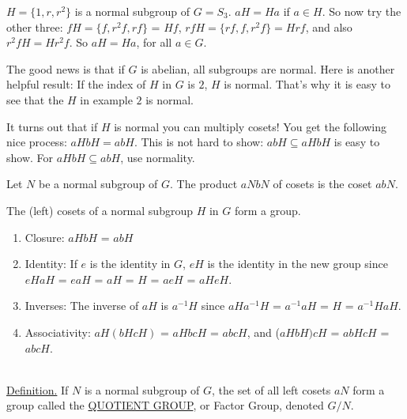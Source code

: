 \documentclass[12pt]{book}
\theoremstyle{definition}
\begin{document}
\begin{tcexample}{}{}
	$H = \{1, r, r^2\}$   is a normal subgroup of $G=S_3$. $aH = Ha$ if $a\in H$. So now try the other three: $fH = \{f, r^2f, rf\}$ = $Hf$, $rfH = \{rf, f, r^2f\} = Hrf$, and also $r^2fH = Hr^2f$. So $aH = Ha$, for all $a\in G$.
\end{tcexample}

The good news is that if $G$ is abelian, all subgroups are normal. Here is another helpful result: If the index of $H$ in $G$ is $2$, $H$ is normal. That's why it is easy to see that the $H$ in example $2$ is normal.

It turns out that if $H$ is normal you can multiply cosets! You get the following nice process: $aHbH = abH$. This is not hard to show: $abH\subseteq aHbH$ is easy to show. For $aHbH\subseteq abH$, use normality.

\begin{tctheorem}{}{}
Let $N$ be a normal subgroup of $G$. The product  $aNbN$ of cosets is the coset $abN$.
\end{tctheorem}

\begin{tctheorem}{}{}
 The (left) cosets of a normal subgroup $H$ in $G$ form a group.
\end{tctheorem}

\begin{newproof}
	\begin{enumerate}
	\item
	
	Closure: $aHbH$ = $abH$
	\item
	
	Identity: If $e$ is the identity in $G$, $eH$ is the identity in the new group since $eHaH$ = $eaH$ = $aH$ = $H$ = $aeH$ = $aH eH$.
	\item
	
	Inverses: The inverse of $aH$ is $a^{-1}H$ since $aHa^{-1}H$ = $a^{-1}aH$ = $H$ = $a^{-1}HaH$.
	\item
	
	Associativity: $aH(bHcH)$ = $aHbcH$ = $abcH$, and ($aHbH)cH$ = $abHcH$ = $abcH$.
\end{enumerate}

\end{newproof}


~\\
\underline{Definition.} If $N$ is a normal subgroup of $G$, the set of all left cosets $aN$ form a group called the \underline{QUOTIENT GROUP}, or Factor Group, denoted $G/N$.\\[.2in]
\end{document}
